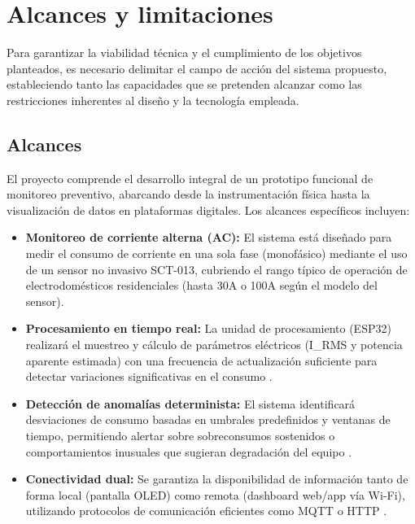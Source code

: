 ﻿\documentclass[12pt,openright,oneside]{report}
\theoremstyle{mytheoremstyle}
\theoremstyle{mytheoremstyle}
\theoremstyle{myproblemstyle}
\begin{document}
\section{Alcances y limitaciones}
\label{subsec:alcances_limitaciones}

Para garantizar la viabilidad técnica y el cumplimiento de los objetivos planteados, es necesario delimitar el campo de acción del sistema propuesto, estableciendo tanto las capacidades que se pretenden alcanzar como las restricciones inherentes al diseño y la tecnología empleada.

\subsection{Alcances}
\label{subsubsec:alcances}

El proyecto comprende el desarrollo integral de un prototipo funcional de monitoreo preventivo, abarcando desde la instrumentación física hasta la visualización de datos en plataformas digitales. Los alcances específicos incluyen:

\begin{itemize}
    \item \textbf{Monitoreo de corriente alterna (AC):} El sistema está diseñado para medir el consumo de corriente en una sola fase (monofásico) mediante el uso de un sensor no invasivo SCT-013, cubriendo el rango típico de operación de electrodomésticos residenciales (hasta 30A o 100A según el modelo del sensor).
    \item \textbf{Procesamiento en tiempo real:} La unidad de procesamiento (ESP32) realizará el muestreo y cálculo de parámetros eléctricos (I\_RMS y potencia aparente estimada) con una frecuencia de actualización suficiente para detectar variaciones significativas en el consumo \cite{nist-sp800-183}.
    \item \textbf{Detección de anomalías determinista:} El sistema identificará desviaciones de consumo basadas en umbrales predefinidos y ventanas de tiempo, permitiendo alertar sobre sobreconsumos sostenidos o comportamientos inusuales que sugieran degradación del equipo \cite{chandola2009anomaly}.
    \item \textbf{Conectividad dual:} Se garantiza la disponibilidad de información tanto de forma local (pantalla OLED) como remota (dashboard web/app vía Wi-Fi), utilizando protocolos de comunicación eficientes como MQTT o HTTP \cite{mqtt-oasis}.
\end{itemize}
\end{document}
